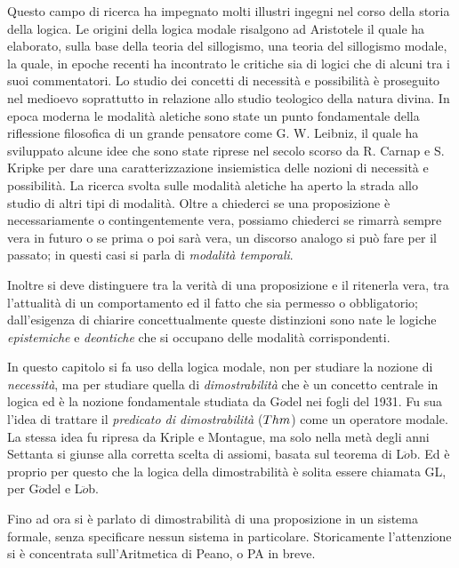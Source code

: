 Questo campo di ricerca ha impegnato molti illustri ingegni nel corso della
storia della logica. Le origini della logica modale risalgono ad Aristotele il
quale ha elaborato, sulla base della teoria del sillogismo, una teoria del sillogismo modale, la quale, in epoche recenti ha incontrato le critiche sia di logici che di alcuni tra i suoi commentatori.
Lo studio dei concetti di necessit\`a e possibilit\`a \`e proseguito nel medioevo soprattutto in relazione allo studio teologico della natura divina. In epoca moderna le modalit\`a aletiche sono state un punto fondamentale della riflessione filosofica di un grande pensatore come G. W. Leibniz, il quale ha sviluppato alcune idee che sono state riprese nel secolo scorso da R. Carnap e S. Kripke per dare una caratterizzazione insiemistica delle nozioni di necessit\`a e possibilit\`a. La ricerca svolta sulle modalit\`a aletiche ha aperto la strada allo studio di altri tipi di modalit\`a. Oltre a chiederci se una proposizione \`e necessariamente o contingentemente vera, possiamo chiederci se rimarr\`a sempre vera in futuro o se prima o poi sar\`a vera, un discorso analogo si pu\`o fare per il passato; in questi casi si parla di \emph{modalit\`a temporali}.

Inoltre si deve distinguere tra la verit\`a di una proposizione e il ritenerla vera, tra l'attualit\`a di un comportamento ed il fatto che sia permesso o obbligatorio; dall'esigenza di chiarire concettualmente queste distinzioni sono nate le logiche \emph{epistemiche} e \emph{deontiche} che si occupano delle modalit\`a corrispondenti.


In questo capitolo si fa uso della logica modale, non per studiare la nozione di \textit{necessità},
ma per studiare quella di \textit{dimostrabilità}
che \`e un concetto centrale in logica ed \`e la nozione fondamentale studiata da G$\ddot{o}$del nei fogli del 1931.
Fu sua l'idea di trattare il \textit{predicato di dimostrabilità} ($Thm$) come un operatore modale.
La stessa idea fu ripresa da Kriple e Montague, ma solo nella metà degli anni Settanta si giunse alla corretta
scelta di assiomi, basata sul teorema di L$\ddot{o}$b. Ed \`e proprio per questo che la logica della 
dimostrabilità \`e solita essere chiamata GL, per G$\ddot{o}$del e L$\ddot{o}$b.

Fino ad ora si \`e parlato di dimostrabilit\`a di una proposizione in un sistema formale, 
senza specificare nessun sistema in particolare. 
Storicamente l'attenzione si \`e concentrata sull'Aritmetica di Peano, o PA in breve. 

